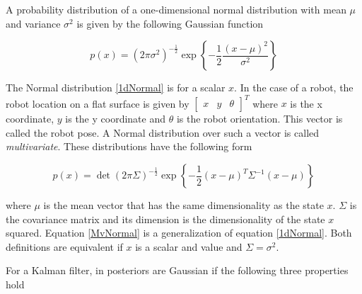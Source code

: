 \documentclass[conference]{IEEEtran}
\begin{document}
A probability distribution of a one-dimensional normal distribution with mean $\mu$ and variance $\sigma ^2$ is given by the following Gaussian function
 
 \begin{equation}\label{1dNormal}
p(x) = (2 \pi \sigma ^ 2) ^ {-\frac{1}{2}} \exp\left\{ - \frac{1}{2} \frac{(x - \mu)^2}{\sigma ^ 2} \right\}
\end{equation}

The Normal distribution \ref{1dNormal} is for a scalar $x$. In the case of a robot, the robot location on a flat surface is given by $\begin{bmatrix} x &   y & \theta \end{bmatrix}^{T}$ where $x$ is the x coordinate, $y$ is the y coordinate and $\theta$ is the robot orientation. This vector is called the robot pose. A Normal distribution over such a vector is called \textit{multivariate}. These distributions have the following form

 \begin{equation}\label{MvNormal}
p(x) = \det(2 \pi \Sigma) ^ {-\frac{1}{2}} \exp\left\{ - \frac{1}{2} (x - \mu)^T \Sigma ^ {-1} (x - \mu) \right\}
\end{equation}

where $\mu$ is the mean vector that has the same dimensionality as the state $x$. $\Sigma$ is the covariance matrix and its dimension is the dimensionality of the state $x$ squared. Equation \ref{MvNormal} is a generalization of equation \ref{1dNormal}. Both definitions are equivalent if $x$ is a scalar and value and $\Sigma = \sigma ^ 2$.

For a Kalman filter, in posteriors are Gaussian if the following three properties hold\\
\end{document}
